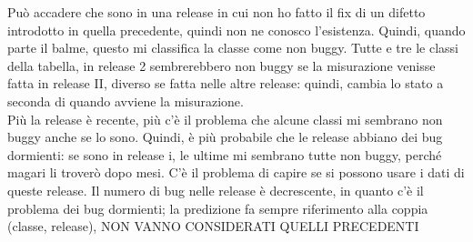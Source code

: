 \documentclass{article}
\begin{document}
Può accadere che sono in una release in cui non ho fatto il fix di un difetto introdotto in quella precedente, quindi non ne conosco l'esistenza. Quindi, quando parte il balme, questo mi classifica la classe come non buggy. Tutte e tre le classi della tabella, in release 2 sembrerebbero non buggy se la misurazione venisse fatta in release II, diverso se fatta nelle altre release: quindi, cambia lo stato a seconda di quando avviene la misurazione.\\ Più la release è recente, più c'è il problema che alcune classi mi sembrano non buggy anche se lo sono. Quindi, è più probabile che le release abbiano dei bug dormienti: se sono in release i, le ultime mi sembrano tutte non buggy, perché magari li troverò dopo mesi. C'è il problema di capire se si possono usare i dati di queste release. Il numero di bug nelle release è decrescente, in quanto c'è il problema dei bug dormienti; la predizione fa sempre riferimento alla coppia (classe, release), NON VANNO CONSIDERATI QUELLI PRECEDENTI
\end{document}
